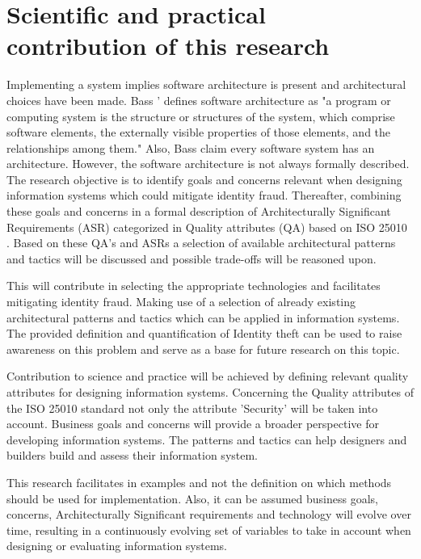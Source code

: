 \section{Scientific and practical contribution of this research}
Implementing a system implies software architecture is present and architectural choices have been made. Bass '\etal \cite{Bass2015SoftwareAI} defines software architecture as "a program or computing system is the structure or structures of the system, which comprise software elements, the externally visible properties of those elements, and the relationships among them." Also, Bass \etal claim every software system has an architecture. However, the software architecture is not always formally described.
The research objective is to identify goals and concerns relevant when designing information systems which could mitigate identity fraud. Thereafter, combining these goals and concerns in a formal description of Architecturally Significant Requirements (ASR) categorized in Quality attributes (QA) based on ISO 25010 \cite{ISO:25010:2011}. Based on these QA's and ASRs a selection of available architectural patterns and tactics will be discussed and possible trade-offs will be reasoned upon.

This will contribute in selecting the appropriate technologies and facilitates mitigating identity fraud. Making use of a selection of already existing architectural patterns and tactics which can be applied in information systems. The provided definition and quantification of Identity theft can be used to raise awareness on this problem and serve as a base for future research on this topic.

Contribution to science and practice will be achieved by defining relevant quality attributes for designing information systems. Concerning the Quality attributes of the ISO 25010 standard not only the attribute 'Security' will be taken into account. Business goals and concerns will provide a broader perspective for developing information systems. The patterns and tactics can help designers and builders build and assess their information system.

This research facilitates in examples and not the definition on which methods should be used for implementation. Also, it can be assumed business goals, concerns, Architecturally Significant requirements and technology will evolve over time, resulting in a continuously evolving set of variables to take in account when designing or evaluating information systems.